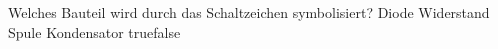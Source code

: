     {Welches Bauteil wird durch das Schaltzeichen symbolisiert?}
    {Diode}
    {Widerstand}
    {Spule}
    {Kondensator}
    {true}{false}